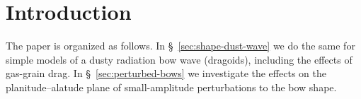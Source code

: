 
\section{Introduction}
\label{sec:introduction}


The paper is organized as follows.
%
In \S~\ref{sec:shape-dust-wave} we do the same for simple models of a
dusty radiation bow wave (dragoids), including the effects of
gas-grain drag.
%
In \S~\ref{sec:perturbed-bows} we investigate the effects on the
planitude--alatude plane of small-amplitude perturbations to the bow
shape.
%

